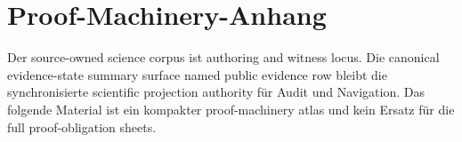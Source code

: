 \section{Proof-Machinery-Anhang}
\label{sec:oc13-proof-machinery-appendix-de}

Der source-owned science corpus ist authoring and witness locus. Die canonical
evidence-state summary surface
named public evidence row
bleibt die synchronisierte scientific projection authority für Audit und
Navigation. Das folgende Material ist ein kompakter proof-machinery atlas und
kein Ersatz für die full proof-obligation sheets.

\begingroup
\footnotesize
\RaggedRight
\sloppy
\setlength{\tabcolsep}{2pt}
\setlength{\LTleft}{0pt}
\setlength{\LTright}{0pt}

\endgroup

